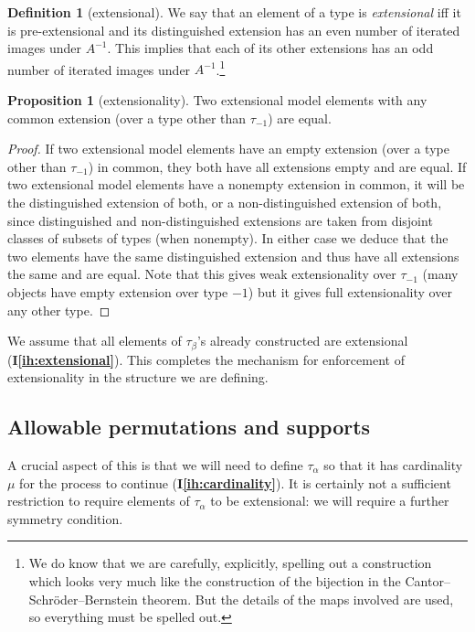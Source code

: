 \documentclass{article}
\theoremstyle{definition}
\newtheorem{proposition}[theorem]{Proposition}
\newtheorem{definition}[theorem]{Definition}
\theoremstyle{remark}
\newcommand{\ihref}[1]{(\textbf{I\ref{#1}})}
\begin{document}
\begin{definition}[extensional]\label{def:extensional}
We say that an element of a type is {\em extensional\/} iff
it is pre-extensional and its distinguished extension has an even number of iterated images under $A^{-1}$.
This implies that each of its other extensions has an odd number of iterated images under $A^{-1}$.\footnote{We do know that we are carefully, explicitly, spelling out a construction which looks very much
like the construction of the bijection in the Cantor--Schr\"oder--Bernstein theorem.  But the details of the maps involved are used, so everything must be spelled out.}
\end{definition}

\begin{proposition}[extensionality]\label{prop:extensionality}
Two extensional model elements with any common extension (over a type other than $\tau_{-1}$) are equal.
\end{proposition}
\begin{proof}
If two extensional model elements have an empty extension (over a type other than $\tau_{-1}$) in common, they both have all extensions empty and are equal.  If two extensional model elements have a nonempty extension in common, it will be the distinguished extension of both, or a non-distinguished extension of both, since distinguished and non-distinguished extensions are taken from disjoint classes of subsets of types (when nonempty).
In either case we deduce that the two elements have the same distinguished extension and thus have all extensions the same and are equal.  Note that this gives weak extensionality over $\tau_{-1}$ (many objects have empty extension over type $-1$) but it gives full extensionality over any other type.
\end{proof}


We assume that all elements of $\tau_\beta$'s already constructed are extensional \ihref{ih:extensional}.  This completes the mechanism for enforcement of extensionality in the structure we are defining.

\subsection{Allowable permutations and supports}

A crucial aspect of this is that we will need to define $\tau_\alpha$ so that it has cardinality $\mu$ for the process to continue {\ihref{ih:cardinality}}.  It is certainly not a sufficient restriction to require elements of $\tau_\alpha$ to be extensional:  we will require a further symmetry condition.
\end{document}
